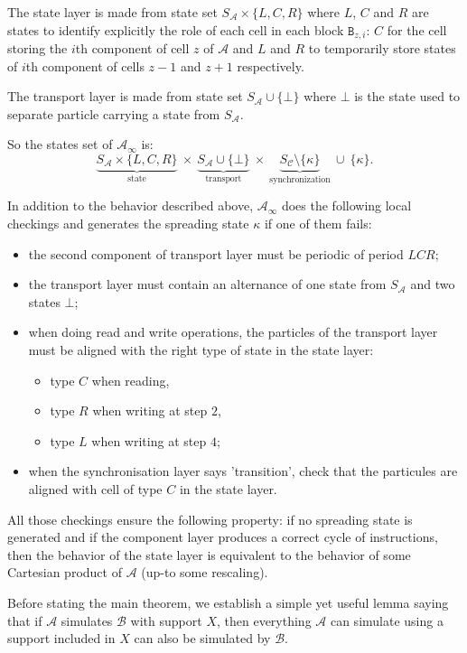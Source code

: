 \documentclass[a4paper]{elsarticle}
\newcommand{\ACA}{\mathcal{A}}
\newcommand{\ACB}{\mathcal{B}}
\newcommand{\ACC}{\mathcal{C}}
\newcommand\alphabe[1]{S_{#1}}
\newcommand{\alphA}{\alphabe{\ACA}}
\newcommand{\alphC}{\alphabe{\ACC}}
\newcommand{\limprod}[1]{{\ACA}_\infty}
\newcommand\blc[1]{\texttt{B}_{#1}}
\begin{document}
The state layer is made from state set ${\alphA\times\{L,C,R\}}$ where
$L$, $C$ and $R$ are states to identify explicitly the role of each
cell in each block $\blc{z,i}$: $C$ for the cell storing the $i$th
component of cell $z$ of $\ACA$ and $L$ and $R$ to temporarily store
states of $i$th component of cells $z-1$ and $z+1$ respectively.

The transport layer is made from state set ${\alphA\cup\{\bot\}}$
where $\bot$ is the state used to separate particle carrying a state
from $\alphA$.

So the states set of $\limprod{\ACA}$ is:
\[\underbrace{\alphA\times\{L,C,R\}}_{\text{state}}\ \times\
\underbrace{\alphA\cup\{\bot\}}_{\text{transport}}\ \times\
\underbrace{\alphC\setminus\{\kappa\}}_{\text{synchronization}}\ \cup\
\{\kappa\}.\] 

In addition to the behavior described above, $\limprod{\ACA}$ does the
following local checkings and generates the spreading state $\kappa$
if one of them fails:
\begin{itemize}
\item the second component of transport layer must be periodic of period ${LCR}$;
\item the transport layer must contain an alternance of one state from
  $\alphA$ and two states $\bot$;
\item when doing read and write operations, the particles of the
  transport layer must be aligned with the right type of state in the state layer:
  \begin{itemize}
  \item type $C$ when reading,
  \item type $R$ when writing at step $2$,
  \item type $L$ when writing at step $4$;
  \end{itemize}
\item when the synchronisation layer says 'transition', check that the
  particules are aligned with cell of type $C$ in the state layer.
\end{itemize}

All those checkings ensure the following property: if no spreading
state is generated and if the component layer produces a correct cycle
of instructions, then the behavior of the state layer is equivalent
to the behavior of some Cartesian product of $\ACA$ (up-to some
rescaling).

Before stating the main theorem, we establish a simple yet useful
lemma saying that if $\ACA$ simulates $\ACB$ with support $X$, then
everything $\ACA$ can simulate using a support included in $X$ can
also be simulated by $\ACB$.
\end{document}
